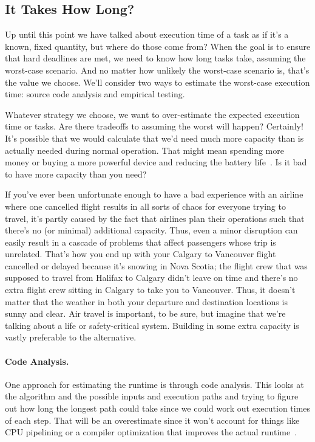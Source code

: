\subsection*{It Takes How Long?}
Up until this point we have talked about execution time of a task as if it's a known, fixed quantity, but where do those come from? When the goal is to ensure that hard deadlines are met, we need to know how long tasks take, assuming the worst-case scenario. And no matter how unlikely the worst-case scenario is, that's the value we choose. We'll consider two ways to estimate the worst-case execution time: source code analysis and empirical testing.

Whatever strategy we choose, we want to over-estimate the expected execution time or tasks. Are there tradeoffs to assuming the worst will happen? Certainly! It's possible that we would calculate that we'd need much more capacity than is actually needed during normal operation. That might mean spending more money or buying a more powerful device and reducing the battery life~\cite{mte241}. Is it bad to have more capacity than you need? 

If you've ever been unfortunate enough to have a bad experience with an airline where one cancelled flight results in all sorts of chaos for everyone trying to travel, it's partly caused by the fact that airlines plan their operations such that there's no (or minimal) additional capacity. Thus, even a minor disruption can easily result in a cascade of problems that affect passengers whose trip is unrelated. That's how you end up with your Calgary to Vancouver flight cancelled or delayed because it's snowing in Nova Scotia; the flight crew that was supposed to travel from Halifax to Calgary didn't leave on time and there's no extra flight crew sitting in Calgary to take you to Vancouver. Thus, it doesn't matter that the weather in both your departure and destination locations is sunny and clear. Air travel is important, to be sure, but imagine that we're talking about a life or safety-critical system. Building in some extra capacity is vastly preferable to the alternative.

\paragraph{Code Analysis.} One approach for estimating the runtime is through code analysis. This looks at the algorithm and the possible inputs and execution paths and trying to figure out how long the longest path could take since we could work out execution times of each step. That will be an overestimate since it won't account for things like CPU pipelining or a compiler optimization that improves the actual runtime~\cite{mte241}.


